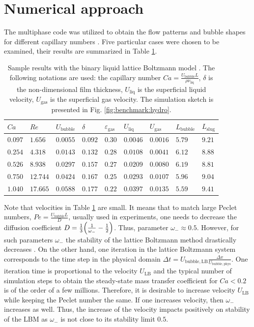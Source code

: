 \documentclass{article}
\newcommand{\lbubble}{L_{\mathrm{bubble}}}
\newcommand{\lslug}{L_{\mathrm{slug}}}
\newcommand{\ububble}{U_{\mathrm{bubble}}}
\newcommand{\uliq}{U_{\mathrm{liq}}}
\newcommand{\ugas}{U_{\mathrm{gas}}}
\newcommand{\omegaminus}{\omega_{-}}
\newcommand{\holdup}{\varepsilon_{\mathrm{gas}}}
\begin{document}
\section{Numerical approach}
\label{sec:numerics}
The multiphase code was utilized to obtain the flow patterns and bubble shapes for different capillary numbers
\cite{kuzmin-binary2d}. Five particular cases were chosen to be examined, their results are summarized
in Table \ref{table:capillary:cases}. 
\begin{table}[htb!]
\begin{tabularx}{\textwidth}{|X|X|X|X|X|X|X|X|X|}
\hline
$Ca$    &$Re$     &$\ububble$ &$\delta$&$\holdup$
&$\uliq$&$\ugas$&$\lbubble$&$\lslug$\\
\hline
$0.097$ &$1.656$  &$0.0055$ &$0.092$ &$0.30$ &$0.0046$&$0.0016$&$5.79$&$9.21$\\ 
$0.254$ &$4.318$  &$0.0143$ &$0.132$ &$0.28$ &$0.0108$&$0.0041$&$6.12$&$8.88$\\ 
$0.526$ &$8.938$  &$0.0297$ &$0.157$ &$0.27$ &$0.0209$&$0.0080$&$6.19$&$8.81$\\
$0.750$ &$12.744$ &$0.0424$ &$0.167$ &$0.25$ &$0.0293$&$0.0107$&$5.96$&$9.04$\\
$1.040$ &$17.665$ &$0.0588$ &$0.177$ &$0.22$ &$0.0397$&$0.0135$&$5.59$&$9.41$\\
\hline
\end{tabularx}
\caption{Sample results with the binary liquid lattice Boltzmann model \cite{kuzmin-binary2d}. The
following notations are used: the capillary number $Ca=\frac{\ububble L}{\rho \nu_{\mathrm{liq}}}$, $\delta$ is the
non-dimensional film thickness, $\uliq$ is the superficial liquid velocity, $\ugas$ is the
superficial gas velocity. The simulation sketch is presented in Fig.
\ref{fig:benchmark:hydro}. \label{table:capillary:cases}}
\end{table}
Note that velocities in Table \ref{table:capillary:cases} are small. It means that to
match large Peclet numbers, $Pe=\frac{\ububble L}{D}$, usually used in experiments, one needs to decrease the diffusion coefficient
$D=\frac{1}{3}\Bigl(\frac{1}{\omegaminus}-\frac{1}{2}\Bigr)$. Thus, parameter $\omegaminus\approx 0.5$. However, for such parameters
$\omegaminus$ the stability of the lattice Boltzmann method drastically decreases
\cite{kuzmin-d1q3}. On the other hand, one iteration in the lattice Boltzmann system corresponds
to the time step in the physical domain  $\Delta t=U_{\mathrm{bubble,LB}} \frac{\Delta
x}{U_{\mathrm{bubble,phys}}}$. One iteration time is proportional to the velocity $U_{\mathrm{LB}}$
and the typical number of simulation steps to obtain the steady-state mass transfer coefficient for
$Ca<0.2$ is of the order of a few millions. Therefore, it is desirable to increase  velocity  $U_{\mathrm{LB}}$
while keeping the Peclet number the same. If one increases velocity, then $\omegaminus$ increases as well. Thus, the increase of the velocity impacts positively on stability of the LBM as $\omegaminus$ is not close to its stability limit $0.5$.  
 
\end{document}
